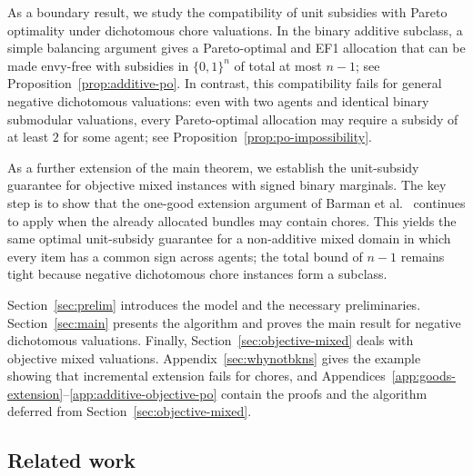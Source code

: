 \documentclass[11pt]{article}
\theoremstyle{plain}
\theoremstyle{plain}
\begin{document}
As a boundary result, we study the compatibility of unit subsidies with Pareto optimality under dichotomous chore valuations. In the binary additive subclass, a simple balancing argument gives a Pareto-optimal and EF1 allocation that can be made envy-free with subsidies in \(\{0,1\}^n\) of total at most \(n-1\); see Proposition~\ref{prop:additive-po}. In contrast, this compatibility fails for general negative dichotomous valuations: even with two agents and identical binary submodular valuations, every Pareto-optimal allocation may require a subsidy of at least \(2\) for some agent; see Proposition~\ref{prop:po-impossibility}.


As a further extension of the main theorem, we establish the unit-subsidy guarantee for objective mixed instances with signed binary marginals. The key step is to show that the one-good extension argument of Barman et al.~\cite{BKNS22} continues to apply when the already allocated bundles may contain chores. This yields the same optimal unit-subsidy guarantee for a non-additive mixed domain in which every item has a common sign across agents; the total bound of \(n-1\) remains tight because negative dichotomous chore instances form a subclass.

Section~\ref{sec:prelim} introduces the model and the necessary preliminaries. Section~\ref{sec:main} presents the algorithm and proves the main result for negative dichotomous valuations. Finally, Section~\ref{sec:objective-mixed} deals with objective mixed valuations. Appendix~\ref{sec:whynotbkns} gives the example showing that incremental extension fails for chores, and Appendices~\ref{app:goods-extension}--\ref{app:additive-objective-po} contain the proofs and the algorithm deferred from Section~\ref{sec:objective-mixed}.

\subsection{Related work}
\end{document}
